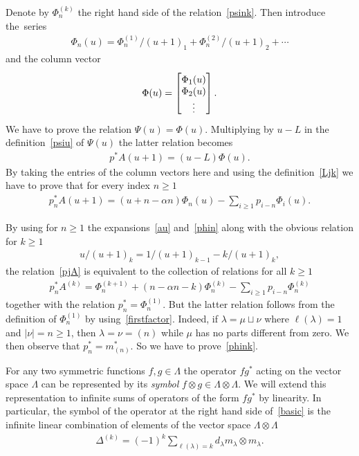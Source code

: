 Denote by $\Phi^{(k)}_n$ the right hand side of the relation~\eqref{psink}.
Then introduce the~series
\begin{gather}
\label{phin}
\Phi_n(u)=\Phi^{(1)}_n/(u+1)_1+\Phi^{(2)}_n/
(u+1)_2+\cdots
\end{gather}
and the column vector
\begin{gather*}
\Phi(u)=
\begin{bmatrix}
\raisebox{0pt}[12pt][0pt]{$\Phi_1(u)$}
\\
\Phi_2(u)
\\
\vdots
\end{bmatrix}
.
\end{gather*}
We have to prove the relation $\Psi(u)=\Phi(u)$.
Multiplying by $u-L$ in the def\/inition~\eqref{psiu} of $\Psi(u)$ the latter relation becomes
\begin{gather*}
p^{\ast}A(u+1)=(u-L)\Phi(u).
\end{gather*}
By taking the entries of the column vectors here and using the def\/inition~\eqref{Ljk} we have to prove
that for every index $n\ge1$
\begin{gather}
\label{pjA}
p^{\ast}_nA(u+1)=(u+n-\alpha n)\Phi_n(u)-\sum_{i\ge1}
p_{i-n}\Phi_i(u).
\end{gather}

By using for $n\ge1$ the expansions~\eqref{au} and~\eqref{phin} along with the obvious relation for $k\ge1$
\begin{gather*}
u/(u+1)_k=1/(u+1)_{k-1}-k/(u+1)_k,
\end{gather*}
the relation~\eqref{pjA} is equivalent to the collection of relations for all $k\ge1$
\begin{gather}
\label{phink}
p^{\ast}_nA^{(k)}=\Phi^{(k+1)}_n+(
n-\alpha n-k)\Phi^{(k)}_n-\sum_{i\ge1}
p_{i-n}\Phi^{(k)}_n
\end{gather}
together with the relation $p^{\ast}_n=\Phi^{(1)}_n$.
But the latter relation follows from the def\/inition of $\Phi^{(1)}_n$ by
using~\eqref{firstfactor}.
Indeed, if $\lambda=\mu\sqcup\nu$ where $\ell(\lambda)=1$ and $|\nu|=n\ge1$, then $\lambda=\nu=(n)$ while
$\mu$ has no parts dif\/ferent from zero.
We then observe that $p_n^{\ast}=m_{(n)}^{\ast}$.
So we have to prove~\eqref{phink}.

For any two symmetric functions $f,g\in\Lambda$ the operator $f g^{\ast}$
acting on the vector space $\Lambda$ can be represented by its \emph{symbol} $f\otimes
g\in\Lambda\otimes\Lambda$.
We will extend this representation to inf\/inite sums of operators of the form $f
g^{\ast}$ by linearity.
In particular, the symbol of the operator at the right hand side of~\eqref{basic} is the inf\/inite linear
combination of elements of the vector space $\Lambda\otimes\Lambda$
\begin{gather}
\label{dek}
\Delta^{(k)}=(-1)^k\sum_{\ell(\lambda)=k}d_\lambda m_\lambda\otimes m_\lambda.
\end{gather}

